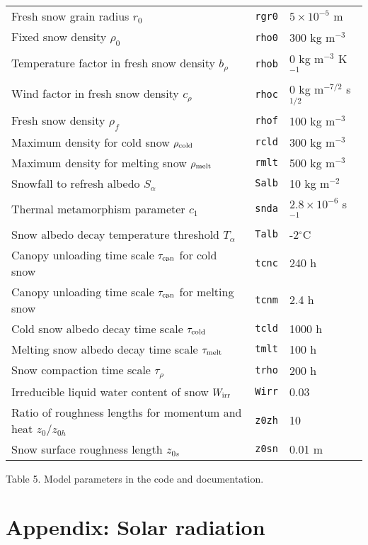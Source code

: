 \documentclass{article}
\begin{document}
\begin{tabular}{|l|l|l|}
Fresh snow grain radius $r_0$                      & {\tt rgr0}   & $5\times10^{-5}$ m \\
Fixed snow density $\rho_0$                        & {\tt rho0}   & 300 kg m$^{-3}$ \\
Temperature factor in fresh snow density $b _\rho$ & {\tt rhob}   & 0 kg m$^{-3}$ K$^{-1}$ \\
Wind factor in fresh snow density $c_\rho$         & {\tt rhoc}   & 0 kg m$^{-7/2}$ s$^{1/2}$\\
Fresh snow density $\rho_f$ & {\tt rhof}           & 100 kg m$^{-3}$ \\
Maximum density for cold snow $\rho_{\rm cold}$    & {\tt rcld} & 300 kg m$^{-3}$ \\
Maximum density for melting snow $\rho_{\rm melt}$ & {\tt rmlt} & 500 kg m$^{-3}$ \\
Snowfall to refresh albedo $S_\alpha$ & {\tt Salb} & 10 kg m$^{-2}$ \\
Thermal metamorphism parameter $c_1$ & {\tt snda}  & $2.8 \times 10^{-6}$ s$^{-1}$ \\
Snow albedo decay temperature threshold $T_\alpha$ & {\tt Talb} & -2$^\circ$C \\
Canopy unloading time scale $\tau_{\rm can}$ for cold snow & {\tt tcnc} & 240 h \\
Canopy unloading time scale $\tau_{\rm can}$ for melting snow & {\tt tcnm} & 2.4 h \\
Cold snow albedo decay time scale $\tau_{\rm cold}$ & {\tt tcld} & 1000 h \\
Melting snow albedo decay time scale $\tau_{\rm melt}$ & {\tt tmlt} & 100 h \\
Snow compaction time scale $\tau_\rho$ & {\tt trho} & 200 h \\
Irreducible liquid water content of snow $W_{\rm irr}$ & {\tt Wirr} & 0.03 \\
Ratio of roughness lengths for momentum and heat $z_0/z_{0h}$ & {\tt z0zh} & 10 \\
Snow surface roughness length $z_{0s}$ & {\tt z0sn} & 0.01 m \\
\hline
\end{tabular}

Table 5. Model parameters in the code and documentation.

\section*{Appendix: Solar radiation}
\end{document}
